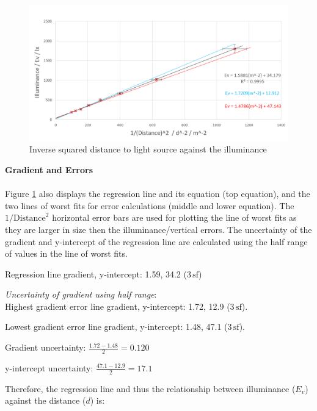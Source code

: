 \documentclass[a4paper,12pt]{article}
\newcommand{\tsf}{\,\text{sf}}
\newcommand{\paragraphnl}[1]{\textbf{#1}\\\\}
\begin{document}
\begin{figure}[H]
    \centering
    \includegraphics[width=\textwidth]{assets/transformgraph.png}
    \caption{Inverse squared distance to light source against the illuminance}
    \label{gph:tdata}
\end{figure}

\paragraphnl{Gradient and Errors}
Figure \ref{gph:tdata} also displays the regression line and its equation (top equation), and the two lines of worst fits for error calculations (middle and lower equation). The $1/\text{Distance}^2$ horizontal error bars are used for plotting the line of worst fits as they are larger in size then the illuminance/vertical errors. The uncertainty of the gradient and y-intercept of the regression line are calculated using the half range of values in the line of worst fits.


Regression line gradient, y-intercept: 1.59, 34.2 ($3 \tsf$)

\textit{Uncertainty of gradient using half range}:\\
Highest gradient error line gradient, y-intercept: 1.72, 12.9 ($3 \tsf$).

Lowest gradient error line gradient, y-intercept: 1.48, 47.1 ($3 \tsf$).

Gradient uncertainty: $\frac{1.72-1.48}{2} = 0.120$

y-intercept uncertainty: $\frac{47.1-12.9}{2} = 17.1$

Therefore, the regression line and thus the relationship between illuminance ($E_v$) against the distance ($d$) is:
\end{document}
